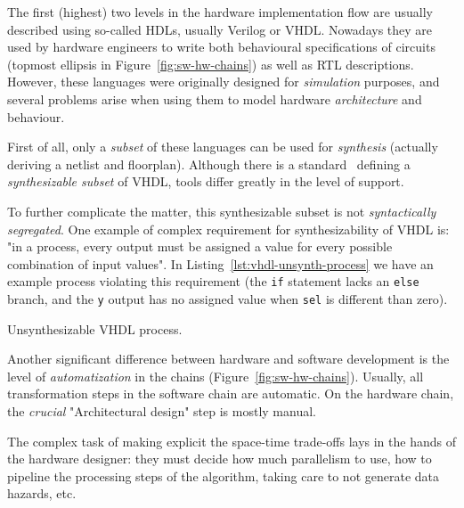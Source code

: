         The first (highest) two levels in the hardware implementation flow are usually described using
        so-called \acp{HDL}, usually Verilog or \acs{VHDL}.
        Nowadays they are used by hardware engineers to write both behavioural specifications of circuits
        (topmost ellipsis in Figure~\ref{fig:sw-hw-chains}) as well as \ac{RTL} descriptions.
        However, these languages were originally designed for \emph{simulation} purposes,
        and several problems arise when using them to model hardware \emph{architecture} and behaviour.

        First of all, only a \emph{subset} of these languages can be used for \emph{synthesis}
        (actually deriving a netlist and floorplan).
        Although there is a standard~\cite{ieee1076-3-synth-vhdl} defining a \emph{synthesizable subset} of \acs{VHDL},
        tools differ greatly in the level of support.

        To further complicate the matter, this synthesizable subset is not \emph{syntactically segregated}.
        One example of complex requirement for synthesizability of \acs{VHDL} is:
        "in a process, every output must be assigned a value for every possible combination of input values".
        In Listing~\ref{lst:vhdl-unsynth-process} we have an example process violating this requirement
        (the \texttt{if} statement lacks an \texttt{else} branch, and the \texttt{y} output has no assigned
        value when \texttt{sel} is different than zero).

        \begin{listing}[h]
            \caption{Unsynthesizable \acs{VHDL} process.\label{lst:vhdl-unsynth-process}}
        \end{listing}

        Another significant difference between hardware and software development
        is the level of \emph{automatization} in the chains (Figure~\ref{fig:sw-hw-chains}).
        Usually, all transformation steps in the software chain are automatic.
        On the hardware chain, the \emph{crucial} "Architectural design" step is mostly manual.

        The complex task of making explicit the space-time trade-offs lays in the hands of the hardware designer:
        they must decide how much parallelism to use, how to pipeline the processing steps of the algorithm,
        taking care to not generate data hazards, etc.

